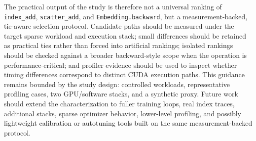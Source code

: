 The practical output of the study is therefore not a universal ranking of \texttt{index\_add}, \texttt{scatter\_add}, and \texttt{Embedding.backward}, but a measurement-backed, tie-aware selection protocol. Candidate paths should be measured under the target sparse workload and execution stack; small differences should be retained as practical ties rather than forced into artificial rankings; isolated rankings should be checked against a broader backward-style scope when the operation is performance-critical; and profiler evidence should be used to inspect whether timing differences correspond to distinct CUDA execution paths. This guidance remains bounded by the study design: controlled workloads, representative profiling cases, two GPU/software stacks, and a synthetic proxy. Future work should extend the characterization to fuller training loops, real index traces, additional stacks, sparse optimizer behavior, lower-level profiling, and possibly lightweight calibration or autotuning tools built on the same measurement-backed protocol.